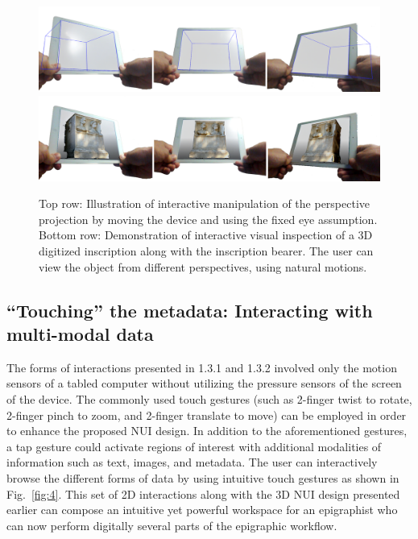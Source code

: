 \documentclass[amsthm,ebook]{saparticle}
\begin{document}
\begin{figure}[!bp]
\centering
 \includegraphics[width=\columnwidth]{EAGLE2016cameraready-img004.png}
 \includegraphics[width=\columnwidth]{EAGLE2016cameraready-img005.png}
\caption{Top row: Illustration of interactive manipulation of the perspective projection by moving the device and using
the {\textquotedbl}fixed eye{\textquotedbl} assumption. Bottom row: Demonstration of interactive visual inspection of a
3D digitized inscription along with the inscription bearer. The user can view the object from different perspectives,
using natural motions.}
\label{fig:3}
\end{figure}



\subsection{``Touching'' the metadata: Interacting with multi-modal data}


\noindent The forms of interactions presented in 1.3.1 and 1.3.2 involved only the motion sensors of a tabled computer without
utilizing the pressure sensors of the screen of the device. The commonly used touch gestures (such as 2-finger twist to
rotate, 2-finger pinch to zoom, and 2-finger translate to move) can be employed in order to enhance the proposed NUI
design. In addition to the aforementioned gestures, a tap gesture could activate regions of interest with additional
modalities of information such as text, images, and metadata. The user can interactively browse the different forms of
data by using intuitive touch gestures as shown in Fig.~\ref{fig:4}. This set of 2D interactions along with the 3D NUI design
presented earlier can compose an intuitive yet powerful workspace for an epigraphist who can now perform digitally
several parts of the epigraphic workflow. 
\end{document}
